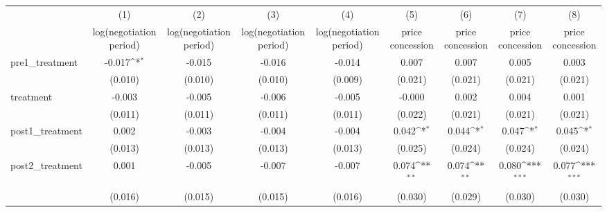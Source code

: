 {
\def\sym#1{\ifmmode^{#1}\else\(^{#1}\)\fi}
\begin{adjustbox}{max width=\textwidth}
\begin{tabular}{l*{8}{c}}
\toprule
            &\multicolumn{1}{c}{(1)}&\multicolumn{1}{c}{(2)}&\multicolumn{1}{c}{(3)}&\multicolumn{1}{c}{(4)}&\multicolumn{1}{c}{(5)}&\multicolumn{1}{c}{(6)}&\multicolumn{1}{c}{(7)}&\multicolumn{1}{c}{(8)}\\
            &\multicolumn{1}{c}{log(negotiation period)}&\multicolumn{1}{c}{log(negotiation period)}&\multicolumn{1}{c}{log(negotiation period)}&\multicolumn{1}{c}{log(negotiation period)}&\multicolumn{1}{c}{price concession}&\multicolumn{1}{c}{price concession}&\multicolumn{1}{c}{price concession}&\multicolumn{1}{c}{price concession}\\
\midrule
pre1\_treatment&      -0.017\sym{*}  &      -0.015         &      -0.016         &      -0.014         &       0.007         &       0.007         &       0.005         &       0.003         \\
            &     (0.010)         &     (0.010)         &     (0.010)         &     (0.009)         &     (0.021)         &     (0.021)         &     (0.021)         &     (0.021)         \\
\addlinespace
treatment   &      -0.003         &      -0.005         &      -0.006         &      -0.005         &      -0.000         &       0.002         &       0.004         &       0.001         \\
            &     (0.011)         &     (0.011)         &     (0.011)         &     (0.011)         &     (0.022)         &     (0.021)         &     (0.021)         &     (0.021)         \\
\addlinespace
post1\_treatment&       0.002         &      -0.003         &      -0.004         &      -0.004         &       0.042\sym{*}  &       0.044\sym{*}  &       0.047\sym{*}  &       0.045\sym{*}  \\
            &     (0.013)         &     (0.013)         &     (0.013)         &     (0.013)         &     (0.025)         &     (0.024)         &     (0.024)         &     (0.024)         \\
\addlinespace
post2\_treatment&       0.001         &      -0.005         &      -0.007         &      -0.007         &       0.074\sym{**} &       0.074\sym{**} &       0.080\sym{***}&       0.077\sym{***}\\
            &     (0.016)         &     (0.015)         &     (0.015)         &     (0.016)         &     (0.030)         &     (0.029)         &     (0.030)         &     (0.030)         \\

\end{tabular}
\end{adjustbox}}
